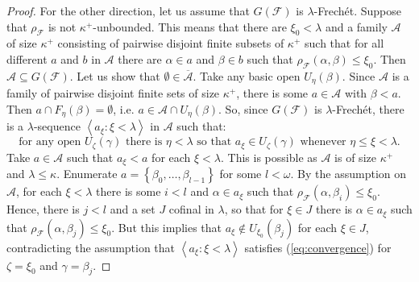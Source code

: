 \documentclass[10pt,a4paper]{amsart}
\newcommand{\g}{\gamma}
\newcommand{\ps}{\emptyset}
\newcommand{\seq}[1]{\left<#1\right>}
\newcommand{\set}[1]{\left\{#1\right\}}
\newcommand{\sst}{\subseteq}
\renewcommand{\a}{\alpha}
\renewcommand{\b}{\beta}
\renewcommand{\k}{\kappa}
\renewcommand{\l}{\lambda}
\renewcommand{\o}{\omega}
\begin{document}
\begin{proof}
	For the other direction, let us assume that $G(\mathcal F)$ is $\l$-Frech\'et.
	Suppose that $\rho_{\mathcal F}$ is not $\k^+$-unbounded.
	This means that there are $\xi_0<\l$ and a family $\mathcal A$ of size $\k^+$ consisting of pairwise disjoint finite subsets of $\k^+$ such that for all different $a$ and $b$ in $\mathcal A$ there are $\a\in a$ and $\b\in b$ such that $\rho_{\mathcal F}(\a,\b)\le \xi_0$.
	Then $\mathcal A\sst G(\mathcal F)$.
	Let us show that $\ps\in\overline{\mathcal A}$.
	Take any basic open $U_{\eta}(\b)$.
	Since $\mathcal A$ is a family of pairwise disjoint finite sets of size $\k^+$, there is some $a\in \mathcal A$ with $\b<a$.
	Then $a\cap F_{\eta}(\b)=\ps$, i.e. $a\in \mathcal A\cap U_{\eta}(\b)$.
	So, since $G(\mathcal F)$ is $\l$-Frech\'et, there is a $\l$-sequence $\seq{a_{\xi}:\xi<\l}$ in $\mathcal A$ such that: \begin{equation}\label{eq:convergence}\mbox{for any open }U_{\zeta}(\g)\mbox{ there is }\eta<\l\mbox{ so that }a_{\xi}\in U_{\zeta}(\g)\mbox{ whenever }\eta\le\xi<\l.\end{equation}
	Take $a\in \mathcal A$ such that $a_{\xi}<a$ for each $\xi<\l$.
	This is possible as $\mathcal A$ is of size $\k^+$ and $\l\le\k$.
	Enumerate $a=\set{\b_0,\dots,\b_{l-1}}$ for some $l<\o$.
	By the assumption on $\mathcal A$, for each $\xi<\l$ there is some $i<l$ and $\a\in a_{\xi}$ such that $\rho_{\mathcal F}(\a,\b_i)\le \xi_0$.
	Hence, there is $j<l$ and a set $J$ cofinal in $\l$, so that for $\xi\in J$ there is $\a\in a_{\xi}$ such that $\rho_{\mathcal F}(\a,\b_j)\le \xi_0$.
	But this implies that $a_{\xi}\notin U_{\xi_0}(\b_j)$ for each $\xi\in J$, contradicting the assumption that $\seq{a_{\xi}:\xi<\l}$ satisfies (\ref{eq:convergence}) for $\zeta=\xi_0$ and $\g=\b_j$.
\end{proof}
\end{document}
